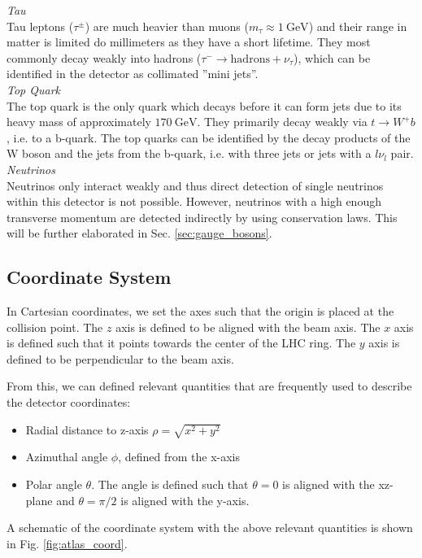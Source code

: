 \documentclass[a4paper]{report}
\numberwithin{equation}{section}
\begin{document}
\noindent \textit{Tau} \\

Tau leptons ($\tau^\pm$) are much heavier than muons ($m_\tau \approx \SI{1}{\giga\electronvolt}$) and their range in matter is limited do millimeters 
as they have a short lifetime. They most commonly decay weakly into hadrons ($\tau^- \rightarrow \mathrm{hadrons} + \nu_\tau$), which can be identified in the detector as collimated ''mini jets''. \\

\noindent \textit{Top Quark} \\

The top quark is the only quark which decays before it can form jets due to its heavy mass of approximately $\SI{170}{\giga\electronvolt}$. They 
primarily decay weakly via $t \rightarrow W^+ b$, i.e. to a b-quark. The top quarks can be identified by the decay products of the W boson and the 
jets from the b-quark, i.e. with three jets or jets with a $l\nu_l$ pair. \\

\noindent \textit{Neutrinos} \\

Neutrinos only interact weakly and thus direct detection of single neutrinos within this detector is not possible. However, neutrinos with a high enough 
transverse momentum are detected indirectly by using conservation laws. This will be further elaborated in Sec. \ref{sec:gauge_bosons}.

\subsection{Coordinate System} 

In Cartesian coordinates, we set the axes such that the origin is placed at the collision point. 
The $z$ axis is defined to be aligned with the beam axis. The $x$ axis is defined such that it 
points towards the center of the LHC ring. The $y$ axis is defined to be perpendicular to the beam axis. 
\par

From this, we can defined relevant quantities that are frequently used to describe the detector coordinates:
\begin{itemize}
	\item Radial distance to z-axis $\rho = \sqrt{x^2 + y^2}$ 
	\item Azimuthal angle $\phi$, defined from the x-axis 
	\item Polar angle $\theta$. The angle is defined such that $\theta = 0$ is aligned with the xz-plane and $\theta = \pi / 2$ is 
			aligned with the y-axis. 
\end{itemize}
A schematic of the coordinate system with the above relevant quantities is shown in Fig. \ref{fig:atlas_coord}.
\end{document}
